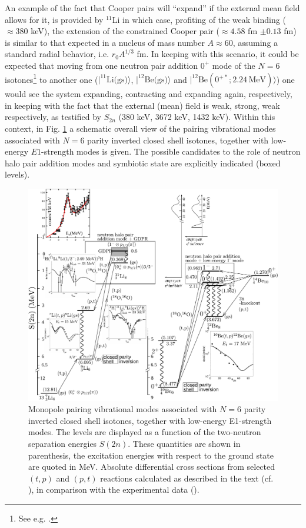 An example of the fact that Cooper pairs will ``expand'' if the external mean field allows for it, is provided by $^{11}$Li in which case, profiting of the weak binding ($\approx 380$ keV), the extension of the constrained Cooper  pair ($\approx 4.58 $ fm $\pm 0.13$ fm)   is similar to that expected in a nucleus of mass number $A\approx 60$, assuming a standard radial behavior, i.e. $r_0 A^{1/3}$ fm. In keeping with this scenario, it could be expected that moving from one neutron pair addition $0^+$ mode of the $N=6$ isotones\footnote{See e.g. \cite{Gori:04}.} to another one ($|^{11}\text{Li(gs)}\rangle$, $|^{12}\text{Be(gs)}\rangle$ and $|^{12}\text{Be}(0^{+*};2.24\,\text{MeV})\rangle$) one would see the system expanding, contracting and expanding again, respectively, in keeping with the fact that the external (mean) field is weak, strong, weak respectively, as testified by $S_{2n}$ (380 keV, 3672 keV, 1432 keV).  
Within this context, in Fig. \ref{fig3.8.1} a schematic overall view of the pairing vibrational modes associated with $N=6$ parity inverted closed shell isotones, together with low-energy $E1$-strength modes is given. The possible candidates to the role of neutron halo pair addition modes and symbiotic state are explicitly indicated (boxed levels).
\begin{figure}
	\centerline{\includegraphics*[width=21cm,angle=90]{nutshell/figs/fig3_8_1_v3}}
	\caption{Monopole pairing vibrational modes associated with 
		$N=6$ parity inverted closed shell isotones, together with low-energy E1-strength modes. 
		The levels are  displayed as a function of the two-neutron separation energies $S(2n)$. 
		These quantities are shown in parenthesis, the excitation energies with respect to the ground state are quoted in MeV. 
		Absolute differential cross sections from selected $(t,p)$ and $(p,t)$ reactions calculated as described in the text (cf. \cite{Potel:10,Potel:14}), 
		in comparison with the experimental data (\cite{Young:71,Fortune:94}).}\label{fig3.8.1}
\end{figure}


